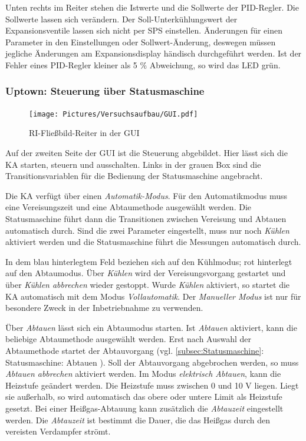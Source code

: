 Unten rechts im Reiter stehen die Istwerte und die Sollwerte der PID-Regler. Die Sollwerte lassen sich verändern. Der Soll-Unterkühlungswert der Expansionsventile lassen sich nicht per SPS einstellen. Änderungen für einen Parameter in den Einstellungen oder Sollwert-Änderung, deswegen müssen jegliche Änderungen am Expansionsdisplay händisch durchgeführt werden. Ist der Fehler eines PID-Regler kleiner als 5 $\%$ Abweichung, so wird das LED grün.     


\subsubsection*{Uptown: Steuerung über Statusmaschine}

\begin{figure}[htb]
\centering		\texttt{[image: Pictures/Versuchsaufbau/GUI.pdf]}
\caption{RI-Fließbild-Reiter in der GUI}
\label{fig:RI}
\end{figure}

Auf der zweiten Seite der GUI ist die Steuerung abgebildet. Hier lässt sich die KA starten, steuern und ausschalten. Links in der grauen Box sind die Transitionsvariablen für die Bedienung der Statusmaschine angebracht. 

Die KA verfügt über einen \textit{Automatik-Modus}. Für den Automatikmodus muss eine Vereisungszeit und eine Abtaumethode ausgewählt werden. Die Statusmaschine führt dann die Transitionen zwischen Vereisung und Abtauen automatisch durch. Sind die zwei Parameter eingestellt, muss nur noch \textit{Kühlen} aktiviert werden und die Statusmaschine führt die Messungen automatisch durch. 

In dem blau hinterlegtem Feld beziehen sich auf den Kühlmodus; rot hinterlegt auf den Abtaumodus. Über \textit{Kühlen} wird der Vereisungsvorgang gestartet und über \textit{Kühlen abbrechen} wieder gestoppt. Wurde \textit{Kühlen} aktiviert, so startet die KA automatisch mit dem Modus \textit{Vollautomatik}. Der \textit{Manueller Modus} ist nur für besondere Zweck in der Inbetriebnahme zu verwenden.

Über \textit{Abtauen} lässt sich ein Abtaumodus starten. Ist \textit{Abtauen} aktiviert, kann die beliebige Abtaumethode ausgewählt werden. Erst nach Auswahl der Abtaumethode startet der Abtauvorgang (vgl. \ref{subsec:Statusmaschine}: Statusmaschine: Abtauen ). Soll der Abtauvorgang abgebrochen werden, so muss \textit{Abtauen abbrechen} aktiviert werden. Im Modus \textit{elektrisch Abtauen}, kann die Heizstufe geändert werden. Die Heizstufe muss zwischen 0 und 10 V liegen. Liegt sie außerhalb, so wird automatisch das obere oder untere Limit als Heizstufe gesetzt. Bei einer Heißgas-Abtauung kann zusätzlich die \textit{Abtauzeit} eingestellt werden. Die \textit{Abtauzeit} ist bestimmt die Dauer, die das Heißgas durch den vereisten Verdampfer strömt.  


